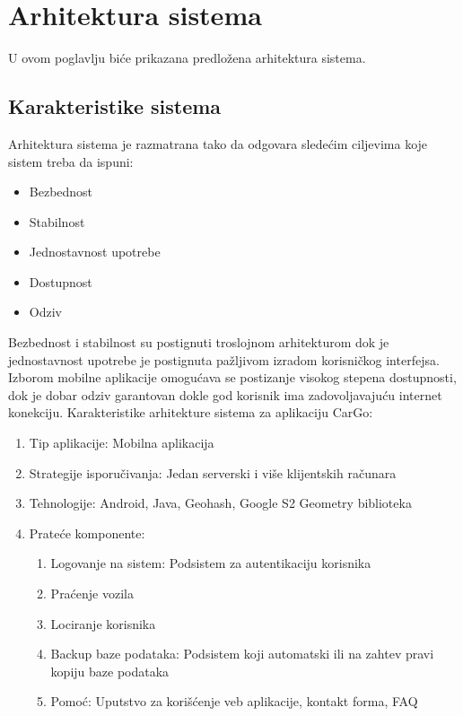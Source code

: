 \newpage

\section{\bfseries Arhitektura sistema}

U ovom poglavlju biće prikazana predložena arhitektura sistema.

\subsection{\bfseries Karakteristike sistema}

Arhitektura sistema je razmatrana tako da odgovara sledećim ciljevima koje sistem treba da ispuni:
\begin{itemize}
    \item Bezbednost
    \item Stabilnost
    \item Jednostavnost upotrebe
    \item Dostupnost
    \item Odziv
\end{itemize}
Bezbednost i stabilnost su postignuti troslojnom arhitekturom dok je jednostavnost upotrebe je postignuta pažljivom izradom korisničkog interfejsa. Izborom mobilne aplikacije omogućava se postizanje visokog stepena dostupnosti, dok je dobar odziv garantovan dokle god korisnik ima zadovoljavajuću internet konekciju.
Karakteristike arhitekture sistema za aplikaciju CarGo:
\begin{enumerate}
    \item Tip aplikacije: Mobilna aplikacija
    \item Strategije isporučivanja: Jedan serverski i više klijentskih računara
    \item Tehnologije: Android, Java, Geohash, Google S2 Geometry biblioteka
    \item Prateće komponente:
    \begin{enumerate}
        \item Logovanje na sistem: Podsistem za autentikaciju korisnika
        \item Praćenje vozila
        \item Lociranje korisnika
        \item Backup baze podataka: Podsistem koji automatski ili na zahtev pravi kopiju baze podataka
        \item Pomoć: Uputstvo za korišćenje veb aplikacije, kontakt forma, FAQ
    \end{enumerate}
\end{enumerate}

